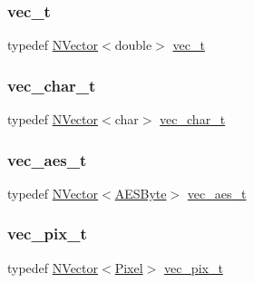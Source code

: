 \subsubsection{\texorpdfstring{vec\_t}{vec\_t}}
{\footnotesize\ttfamily typedef \mbox{\hyperlink{class_n_vector}{N\+Vector}}$<$double$>$ \mbox{\hyperlink{group___n_algebra_ga0a2cfc67e738a3d73e4f12098c4c07f6}{vec\+\_\+t}}}

\mbox{\label{group___n_algebra_ga4be4d9f61d1c170b61a0a4bdeccac8f1}} 
\subsubsection{\texorpdfstring{vec\_char\_t}{vec\_char\_t}}
{\footnotesize\ttfamily typedef \mbox{\hyperlink{class_n_vector}{N\+Vector}}$<$char$>$ \mbox{\hyperlink{group___n_algebra_ga4be4d9f61d1c170b61a0a4bdeccac8f1}{vec\+\_\+char\+\_\+t}}}

\mbox{\label{group___n_algebra_gad347c291514f4b97d883742568d3f8a7}} 
\subsubsection{\texorpdfstring{vec\_aes\_t}{vec\_aes\_t}}
{\footnotesize\ttfamily typedef \mbox{\hyperlink{class_n_vector}{N\+Vector}}$<$\mbox{\hyperlink{class_a_e_s_byte}{A\+E\+S\+Byte}}$>$ \mbox{\hyperlink{group___n_algebra_gad347c291514f4b97d883742568d3f8a7}{vec\+\_\+aes\+\_\+t}}}

\mbox{\label{group___n_algebra_gabd4c731d10a091af31f8476c9143c453}} 
\subsubsection{\texorpdfstring{vec\_pix\_t}{vec\_pix\_t}}
{\footnotesize\ttfamily typedef \mbox{\hyperlink{class_n_vector}{N\+Vector}}$<$\mbox{\hyperlink{class_pixel}{Pixel}}$>$ \mbox{\hyperlink{group___n_algebra_gabd4c731d10a091af31f8476c9143c453}{vec\+\_\+pix\+\_\+t}}}

